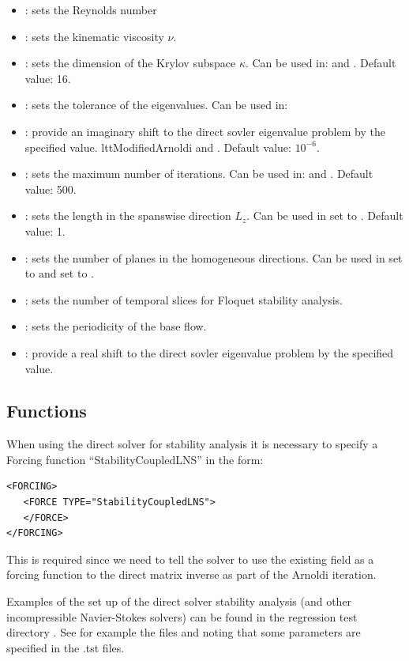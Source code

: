 \begin{itemize}
\item {}: sets the Reynolds number
\item {}: sets the kinematic viscosity $\nu$.
\item {}: sets the dimension of the Krylov subspace $\kappa$. Can be used in:  and . Default value: 16.
\item {}: sets the tolerance of the eigenvalues. Can be used in: \item {}: provide an imaginary shift to the direct sovler eigenvalue problem by the specified value. 
ltt{ModifiedArnoldi} and . Default value: $10^{-6}$.
\item {}: sets the maximum number of iterations. Can be used in:  and . Default value: 500.
\item {}:  sets the length in the spanswise direction $L_z$. Can be used in  set to . Default value: 1.
\item {}: sets the number of planes in the homogeneous directions. Can be used in  set to  and  set to .
\item {}: sets the number of temporal slices for Floquet stability analysis.
\item {}: sets the periodicity of the base flow.
\item {}: provide a real shift to the direct sovler eigenvalue problem by the specified value. 
\end{itemize}

\subsection{Functions}
When using the direct solver for stability analysis it is necessary to specify a Forcing function ``StabilityCoupledLNS'' in the form:
\begin{lstlisting}[style=XMLStyle]
<FORCING>
   <FORCE TYPE="StabilityCoupledLNS">
   </FORCE>
</FORCING>
\end{lstlisting}

This is required since we need to tell the solver to use the existing
field as a forcing function to the direct matrix inverse as part of
the Arnoldi iteration.


\begin{notebox}
Examples of the set up of the direct solver stability analysis (and
other incompressible Navier-Stokes solvers) can be found in the
regression test directory
. See for example the files
 and 
noting that some parameters are specified in the .tst files.
\end{notebox}

